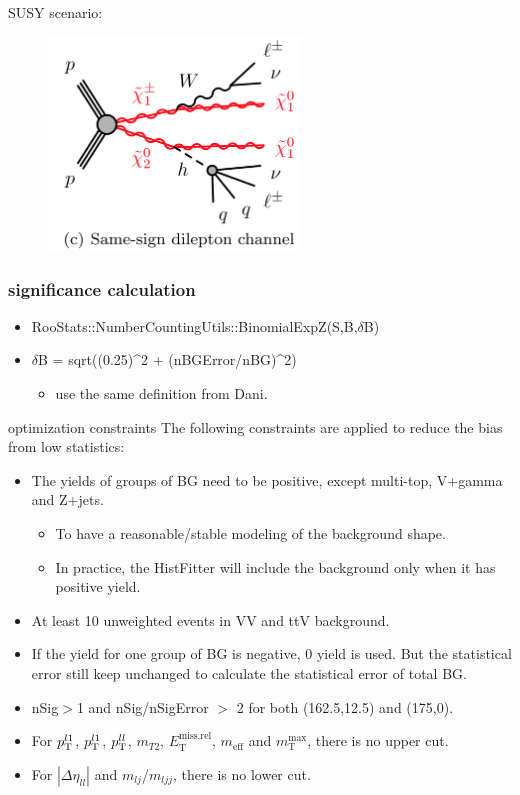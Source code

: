 \documentclass[mathserif,serif]{beamer}
\begin{document}
\begin{frame}
\small
SUSY scenario:\\
\begin{figure}
\includegraphics[width=0.6\textwidth]{data/photo/Wh.png}
\end{figure}
\end{frame}

\begin{frame}
\frametitle{significance calculation}
\begin{itemize}
\item RooStats::NumberCountingUtils::BinomialExpZ(S,B,$\delta$B)
\item $\delta$B = sqrt((0.25)\^{}2 + (nBGError/nBG)\^{}2)
\begin{itemize}
\item use the same definition from Dani.
\end{itemize}
\end{itemize}
\end{frame}

\begin{frame}{optimization constraints}
\small
The following constraints are applied to reduce the bias from low statistics:
\begin{itemize}
\small
\item The yields of groups of BG need to be positive, except multi-top, V+gamma and Z+jets.
\begin{itemize}
\item To have a reasonable/stable modeling of the background shape.
\item In practice, the HistFitter will include the background only when it has positive yield.
\end{itemize}
\item At least 10 unweighted events in VV and ttV background.
\item If the yield for one group of BG is negative, 0 yield is used. But the statistical error still keep unchanged to calculate the statistical error of total BG.
\item nSig$>$1 and nSig/nSigError $>$ 2 for both (162.5,12.5) and (175,0).
\item For $p_{\text{T}}^{l1}$, $p_{\text{T}}^{l1}$, $p_{\text{T}}^{ll}$, $m_{T2}$, $E_{\text{T}}^{\text{miss,rel}}$, $m_{\text{eff}}$ and $m_{\text{T}}^{\text{max}}$, there is no upper cut.
\item For $|\Delta\eta_{ll}|$ and $m_{lj}$/$m_{ljj}$, there is no lower cut.
\end{itemize}
\end{frame}
\end{document}
